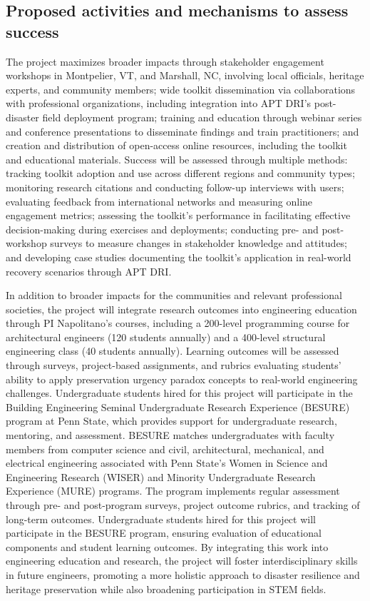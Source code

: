 \documentclass[11pt]{article}
\begin{document}
\subsection{Proposed activities and mechanisms to assess success}
The project maximizes broader impacts through stakeholder engagement workshops in Montpelier, VT, and Marshall, NC, involving local officials, heritage experts, and community members; wide toolkit dissemination via collaborations with professional organizations, including integration into APT DRI’s post-disaster field deployment program; training and education through webinar series and conference presentations to disseminate findings and train practitioners; and creation and distribution of open-access online resources, including the toolkit and educational materials. Success will be assessed through multiple methods: tracking toolkit adoption and use across different regions and community types; monitoring research citations and conducting follow-up interviews with users; evaluating feedback from international networks and measuring online engagement metrics; assessing the toolkit’s performance in facilitating effective decision-making during exercises and deployments; conducting pre- and post-workshop surveys to measure changes in stakeholder knowledge and attitudes; and developing case studies documenting the toolkit’s application in real-world recovery scenarios through APT DRI.

In addition to broader impacts for the communities and relevant professional societies, the project will integrate research outcomes into engineering education through PI Napolitano's courses, including a 200-level programming course for architectural engineers (120 students annually) and a 400-level structural engineering class (40 students annually). 
Learning outcomes will be assessed through surveys, project-based assignments, and rubrics evaluating students’ ability to apply preservation urgency paradox concepts to real-world engineering challenges. 
Undergraduate students hired for this project will participate in the Building Engineering Seminal Undergraduate Research Experience (BESURE) program at Penn State, which provides support for undergraduate research, mentoring, and assessment. 
BESURE matches undergraduates with faculty members from computer science and civil, architectural, mechanical, and electrical engineering associated with Penn State’s Women in Science and Engineering Research (WISER) and Minority Undergraduate Research Experience (MURE) programs.
The program implements regular assessment through pre- and post-program surveys, project outcome rubrics, and tracking of long-term outcomes. 
Undergraduate students hired for this project will participate in the BESURE program, ensuring evaluation of educational components and student learning outcomes. 
By integrating this work into engineering education and research, the project will foster interdisciplinary skills in future engineers, promoting a more holistic approach to disaster resilience and heritage preservation while also broadening participation in STEM fields. 
\end{document}
